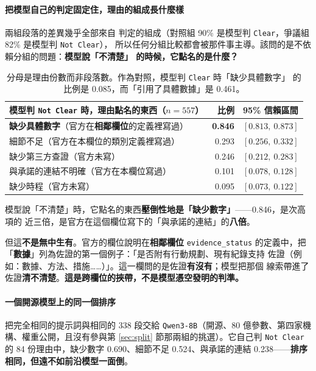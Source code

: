 \documentclass[11pt,a4paper]{ctexart}
\newcommand{\fn}[1]{\texttt{#1}}
\begin{document}
\paragraph{把模型自己的判定固定住，理由的組成長什麼樣} 兩組段落的差異幾乎全部來自
判定的組成（對照組 90\% 是模型判 \fn{Clear}，爭議組 82\% 是模型判 \fn{Not Clear}），
所以任何分組比較都會被那件事主導。該問的是不依賴分組的問題：\textbf{模型說「不清楚」
的時候，它點名的是什麼？}

\begin{table}[h]
\centering\small
\begin{tabular}{@{}lrl@{}}
\toprule
模型判 \fn{Not Clear} 時，理由點名的東西（$n = 557$） & 比例 & 95\% 信賴區間 \\
\midrule
\rowcolor{yellow!12}
\textbf{缺少具體數字}（官方在\textbf{相鄰欄位}的定義裡寫過） & \textbf{0.846} & $[0.813,\ 0.873]$ \\
細節不足（官方在本欄位的類別定義裡寫過） & 0.293 & $[0.256,\ 0.332]$ \\
缺少第三方查證（官方未寫） & 0.246 & $[0.212,\ 0.283]$ \\
與承諾的連結不明確（官方在本欄位寫過） & 0.101 & $[0.078,\ 0.128]$ \\
缺少時程（官方未寫） & 0.095 & $[0.073,\ 0.122]$ \\
\bottomrule
\end{tabular}
\caption{分母是理由份數而非段落數。作為對照，模型判 \fn{Clear} 時「缺少具體數字」
的比例是 0.085，而「引用了具體數據」是 0.461。}
\end{table}

\begin{tcolorbox}[colback=blue!5, colframe=blue!55, title=這張表能說什麼]
模型說「不清楚」時，它點名的東西\textbf{壓倒性地是「缺少數字」}——0.846，是次高項的
近三倍，是官方在這個欄位寫下的「與承諾的連結」的\textbf{八倍}。

\medskip
但這\textbf{不是無中生有}。官方的欄位說明在\textbf{相鄰欄位} \fn{evidence\_status}
的定義中，把「\textbf{數據}」列為佐證的第一個例子：「是否附有行動規劃、現有紀錄支持
佐證（例如：數據、方法、措施……）」。這一欄問的是佐證\textbf{有沒有}；模型把那個
線索帶進了佐證\textbf{清不清楚}。\textbf{這是跨欄位的挾帶，不是模型憑空發明的判準。}
\end{tcolorbox}

\paragraph{一個開源模型上的同一個排序} 把完全相同的提示詞與相同的 338 段交給
\fn{Qwen3-8B}（開源、80 億參數、第四家機構、權重公開，且沒有參與第 \ref{sec:split}
節那兩組的挑選）。它自己判 \fn{Not Clear} 的 84 份理由中，缺少數字 0.690、細節不足
0.524、與承諾的連結 0.238——\textbf{排序相同，但遠不如前沿模型一面倒}。
\end{document}
